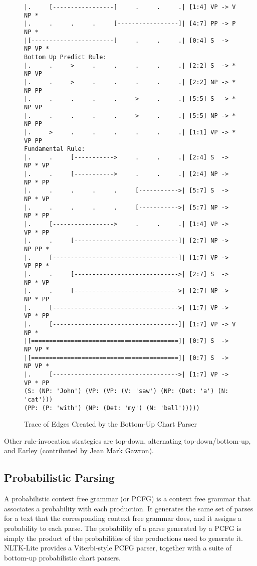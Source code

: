 \documentclass[11pt]{article}
\begin{document}
\begin{figure*}[p]
{\begin{verbatim}
|.     [-----------------]     .     .     .| [1:4] VP -> V NP * 
|.     .     .     .     [-----------------]| [4:7] PP -> P NP * 
|[-----------------------]     .     .     .| [0:4] S  -> NP VP * 
Bottom Up Predict Rule:
|.     .     >     .     .     .     .     .| [2:2] S  -> * NP VP 
|.     .     >     .     .     .     .     .| [2:2] NP -> * NP PP 
|.     .     .     .     .     >     .     .| [5:5] S  -> * NP VP 
|.     .     .     .     .     >     .     .| [5:5] NP -> * NP PP 
|.     >     .     .     .     .     .     .| [1:1] VP -> * VP PP 
Fundamental Rule:
|.     .     [----------->     .     .     .| [2:4] S  -> NP * VP 
|.     .     [----------->     .     .     .| [2:4] NP -> NP * PP 
|.     .     .     .     .     [----------->| [5:7] S  -> NP * VP 
|.     .     .     .     .     [----------->| [5:7] NP -> NP * PP 
|.     [----------------->     .     .     .| [1:4] VP -> VP * PP 
|.     .     [-----------------------------]| [2:7] NP -> NP PP * 
|.     [-----------------------------------]| [1:7] VP -> VP PP * 
|.     .     [----------------------------->| [2:7] S  -> NP * VP 
|.     .     [----------------------------->| [2:7] NP -> NP * PP 
|.     [----------------------------------->| [1:7] VP -> VP * PP 
|.     [-----------------------------------]| [1:7] VP -> V NP * 
|[=========================================]| [0:7] S  -> NP VP * 
|[=========================================]| [0:7] S  -> NP VP * 
|.     [----------------------------------->| [1:7] VP -> VP * PP 
(S: (NP: 'John') (VP: (VP: (V: 'saw') (NP: (Det: 'a') (N: 'cat')))
(PP: (P: 'with') (NP: (Det: 'my') (N: 'ball')))))
\end{verbatim}}
\caption{Trace of Edges Created by the Bottom-Up Chart Parser\label{fig:chart}}
\end{figure*}

Other rule-invocation strategies are top-down, alternating
top-down/bottom-up, and Earley (contributed by Jean Mark Gawron).

\subsection{Probabilistic Parsing}

A probabilistic context free grammar (or PCFG) is a context free
grammar that associates a probability with each production. It
generates the same set of parses for a text that the corresponding
context free grammar does, and it assigns a probability to each parse.
The probability of a parse generated by a PCFG is simply the product
of the probabilities of the productions used to generate it.
NLTK-Lite provides a Viterbi-style PCFG parser, together with a suite
of bottom-up probabilistic chart parsers.
\end{document}
